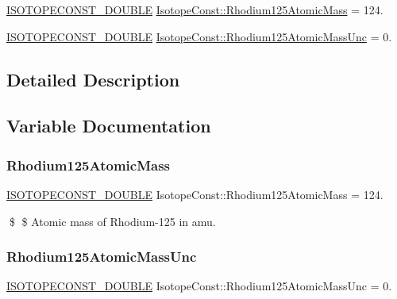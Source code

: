 \begin{DoxyCompactItemize}
\item 
\mbox{\hyperlink{group___isotope_const-_macros_ga8f45a7272ce02c0b4c65c44636ed719a}{I\+S\+O\+T\+O\+P\+E\+C\+O\+N\+S\+T\+\_\+\+D\+O\+U\+B\+LE}} \mbox{\hyperlink{group___isotope_const-_rhodium-_rh125_gad6a91751a3b65458e0d09c7afa211e58}{Isotope\+Const\+::\+Rhodium125\+Atomic\+Mass}} = 124.
\item 
\mbox{\hyperlink{group___isotope_const-_macros_ga8f45a7272ce02c0b4c65c44636ed719a}{I\+S\+O\+T\+O\+P\+E\+C\+O\+N\+S\+T\+\_\+\+D\+O\+U\+B\+LE}} \mbox{\hyperlink{group___isotope_const-_rhodium-_rh125_ga5ee6b5e5423db2890f1daad05e1785f7}{Isotope\+Const\+::\+Rhodium125\+Atomic\+Mass\+Unc}} = 0.
\end{DoxyCompactItemize}


\subsection{Detailed Description}


\subsection{Variable Documentation}
\mbox{\label{group___isotope_const-_rhodium-_rh125_gad6a91751a3b65458e0d09c7afa211e58}} 
\subsubsection{\texorpdfstring{Rhodium125\+Atomic\+Mass}{Rhodium125AtomicMass}}
{\footnotesize\ttfamily \mbox{\hyperlink{group___isotope_const-_macros_ga8f45a7272ce02c0b4c65c44636ed719a}{I\+S\+O\+T\+O\+P\+E\+C\+O\+N\+S\+T\+\_\+\+D\+O\+U\+B\+LE}} Isotope\+Const\+::\+Rhodium125\+Atomic\+Mass = 124.}

\$ \$ Atomic mass of Rhodium-\/125 in amu. \mbox{\label{group___isotope_const-_rhodium-_rh125_ga5ee6b5e5423db2890f1daad05e1785f7}} 
\subsubsection{\texorpdfstring{Rhodium125\+Atomic\+Mass\+Unc}{Rhodium125AtomicMassUnc}}
{\footnotesize\ttfamily \mbox{\hyperlink{group___isotope_const-_macros_ga8f45a7272ce02c0b4c65c44636ed719a}{I\+S\+O\+T\+O\+P\+E\+C\+O\+N\+S\+T\+\_\+\+D\+O\+U\+B\+LE}} Isotope\+Const\+::\+Rhodium125\+Atomic\+Mass\+Unc = 0.}

